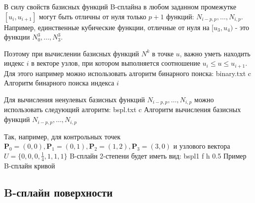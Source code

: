 \documentclass{bmstu}
\begin{document}
В силу свойств базисных функций B-сплайна в любом заданном промежутке $[u_i, u_{i+1}]$ могут быть отличны от нуля только $p+1$ функций: $N_{i-p, p},\dots,N_{i,p}$. Например, единственные кубические функции, отличные от нуля на $[u_3, u_4)$ - это функции $N_0^3,\dots,N_3^3$.

Поэтому при вычислении базисных функций $N^k$ в точке $u$, важно уметь находить индекс $i$ в векторе узлов, при котором выполняется соотношение $u_i\le u \le u_{i+1}$.
Для этого например можно использовать алгоритм бинарного поиска:
{binary.txt} %
{c} %
{Алгоритм бинарного поиска индекса $i$} %

Для вычисления ненулевых базисных функций $N_{i-p, p},\dots,N_{i,p}$ можно использовать следующий алгоритм:
{bspl.txt} %
{c} %
{Алгоритм вычисления базисных функций $N_{i-p, p},\dots,N_{i,p}$} %

Так, например, для контрольных точек $\mathbf{P}_0 = (0,0), \mathbf{P}_1 = (0,1), \mathbf{P}_2 = (1,2), \mathbf{P}_3 = (3,0)$ и узлового вектора $U=\{0,0,0,\frac{1}4,1,1,1\}$ B-сплайн 2-степени будет иметь вид:
{bspl1} %
{f} %
{h} %
{0.5\textwidth} %
{Пример B-сплайн кривой} %

\subsection{B-сплайн поверхности}
\end{document}
